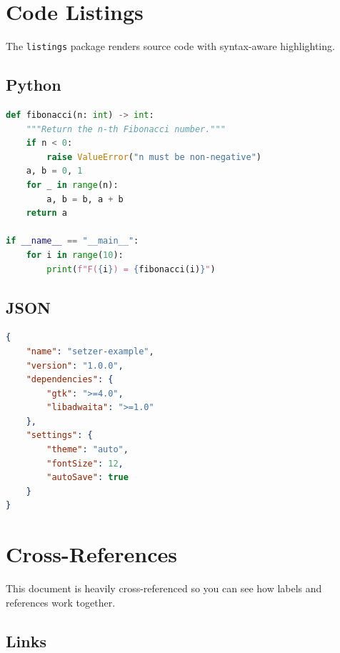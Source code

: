 \documentclass[11pt]{article}
\theoremstyle{definition}
\theoremstyle{plain}
\begin{document}
\section{Code Listings}
\label{sec:code}

The \texttt{listings} package renders source code with syntax-aware
highlighting.

\subsection{Python}
\label{sec:code:python}

\begin{lstlisting}[language=Python, caption={A simple Python function.}]
def fibonacci(n: int) -> int:
    """Return the n-th Fibonacci number."""
    if n < 0:
        raise ValueError("n must be non-negative")
    a, b = 0, 1
    for _ in range(n):
        a, b = b, a + b
    return a

if __name__ == "__main__":
    for i in range(10):
        print(f"F({i}) = {fibonacci(i)}")
\end{lstlisting}

\subsection{JSON}
\label{sec:code:json}

\begin{lstlisting}[language=JSON, caption={A sample configuration file.}]
{
    "name": "setzer-example",
    "version": "1.0.0",
    "dependencies": {
        "gtk": ">=4.0",
        "libadwaita": ">=1.0"
    },
    "settings": {
        "theme": "auto",
        "fontSize": 12,
        "autoSave": true
    }
}
\end{lstlisting}

\section{Cross-References}
\label{sec:references}

This document is heavily cross-referenced so you can see how labels
and references work together.

\subsection{Links}
\label{sec:references:links}
\end{document}
